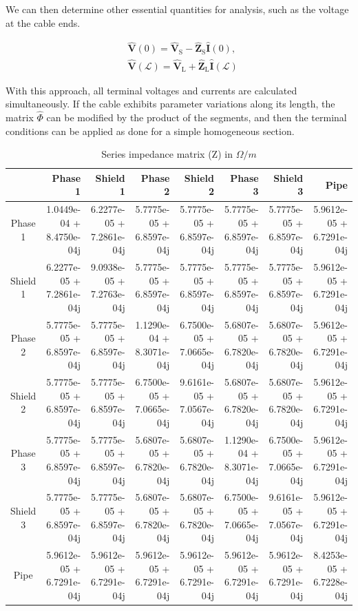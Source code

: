 \documentclass[journal,transmag]{IEEEtran}
\begin{document}
We can then determine other essential quantities for analysis, such as the voltage at the cable ends.

\begin{equation}
\begin{aligned}
&\hat{\mathbf{V}}(0)=\hat{\mathbf{V}}_{\mathrm{S}}-\hat{\mathbf{Z}}_{\mathrm{S}} \hat{\mathbf{I}}(0),\\
&\hat{\mathbf{V}}(\mathscr{L})=\hat{\mathbf{V}}_{\mathrm{L}}+\hat{\mathbf{Z}}_{\mathrm{L}} \hat{\mathbf{I}}(\mathscr{L})
\end{aligned}
\end{equation}

With this approach, all terminal voltages and currents are calculated simultaneously. If the cable exhibits parameter variations along its length, the matrix $\hat{\Phi}$ can be modified by the product of the segments, and then the terminal conditions can be applied as done for a simple homogeneous section.

\begin{table}[t!]
\tiny %
\centering
\caption{Series impedance matrix (Z) in $\Omega/m$}
\label{tab:Z}
\begin{tabular}{crrrrrrr}
\toprule
 & Phase 1 & Shield 1 & Phase 2 & Shield 2 & Phase 3 & Shield 3 & Pipe \\
\midrule
Phase 1 & 1.0449e-04 + 8.4750e-04j & 6.2277e-05 + 7.2861e-04j & 5.7775e-05 + 6.8597e-04j & 5.7775e-05 + 6.8597e-04j & 5.7775e-05 + 6.8597e-04j & 5.7775e-05 + 6.8597e-04j & 5.9612e-05 + 6.7291e-04j \\
Shield 1 & 6.2277e-05 + 7.2861e-04j & 9.0938e-05 + 7.2763e-04j & 5.7775e-05 + 6.8597e-04j & 5.7775e-05 + 6.8597e-04j & 5.7775e-05 + 6.8597e-04j & 5.7775e-05 + 6.8597e-04j & 5.9612e-05 + 6.7291e-04j \\
Phase 2 & 5.7775e-05 + 6.8597e-04j & 5.7775e-05 + 6.8597e-04j & 1.1290e-04 + 8.3071e-04j & 6.7500e-05 + 7.0665e-04j & 5.6807e-05 + 6.7820e-04j & 5.6807e-05 + 6.7820e-04j & 5.9612e-05 + 6.7291e-04j \\
Shield 2 & 5.7775e-05 + 6.8597e-04j & 5.7775e-05 + 6.8597e-04j & 6.7500e-05 + 7.0665e-04j & 9.6161e-05 + 7.0567e-04j & 5.6807e-05 + 6.7820e-04j & 5.6807e-05 + 6.7820e-04j & 5.9612e-05 + 6.7291e-04j \\
Phase 3 & 5.7775e-05 + 6.8597e-04j & 5.7775e-05 + 6.8597e-04j & 5.6807e-05 + 6.7820e-04j & 5.6807e-05 + 6.7820e-04j & 1.1290e-04 + 8.3071e-04j & 6.7500e-05 + 7.0665e-04j & 5.9612e-05 + 6.7291e-04j \\
Shield 3 & 5.7775e-05 + 6.8597e-04j & 5.7775e-05 + 6.8597e-04j & 5.6807e-05 + 6.7820e-04j & 5.6807e-05 + 6.7820e-04j & 6.7500e-05 + 7.0665e-04j & 9.6161e-05 + 7.0567e-04j & 5.9612e-05 + 6.7291e-04j \\
Pipe & 5.9612e-05 + 6.7291e-04j & 5.9612e-05 + 6.7291e-04j & 5.9612e-05 + 6.7291e-04j & 5.9612e-05 + 6.7291e-04j & 5.9612e-05 + 6.7291e-04j & 5.9612e-05 + 6.7291e-04j & 8.4253e-05 + 6.7228e-04j \\
\bottomrule
\end{tabular}
\end{table}
\end{document}
